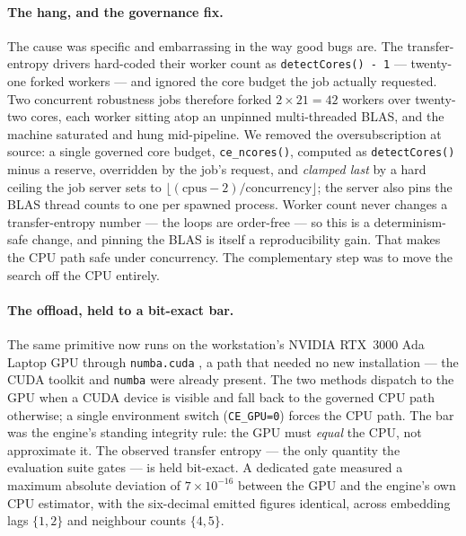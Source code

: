 \documentclass[11pt]{article}
\newcommand{\code}[1]{\texttt{\small #1}}
\begin{document}
\paragraph{The hang, and the governance fix.} The cause was specific and
embarrassing in the way good bugs are. The transfer-entropy drivers hard-coded
their worker count as \code{detectCores() - 1} --- twenty-one forked workers ---
and ignored the core budget the job actually requested. Two concurrent
robustness jobs therefore forked $2 \times 21 = 42$ workers over twenty-two
cores, each worker sitting atop an unpinned multi-threaded BLAS, and the machine
saturated and hung mid-pipeline. We removed the oversubscription at source: a
single governed core budget, \code{ce\_ncores()}, computed as
\code{detectCores()} minus a reserve, overridden by the job's request, and
\emph{clamped last} by a hard ceiling the job server sets to
$\lfloor(\text{cpus}-2)/\text{concurrency}\rfloor$; the server also pins the BLAS
thread counts to one per spawned process. Worker count never changes a
transfer-entropy number --- the loops are order-free --- so this is a
determinism-safe change, and pinning the BLAS is itself a reproducibility gain.
That makes the CPU path safe under concurrency. The complementary step was to
move the search off the CPU entirely.

\paragraph{The offload, held to a bit-exact bar.} The same primitive now runs on
the workstation's NVIDIA RTX~3000 Ada Laptop GPU through \code{numba.cuda}
\cite{numba2015}, a path that needed no new installation --- the CUDA toolkit
and \code{numba} were already present. The two methods dispatch to the GPU when
a CUDA device is visible and fall back to the governed CPU path otherwise; a
single environment switch (\code{CE\_GPU=0}) forces the CPU path. The bar was the
engine's standing integrity rule: the GPU must \emph{equal} the CPU, not
approximate it. The observed transfer entropy --- the only quantity the
evaluation suite gates --- is held bit-exact. A dedicated gate measured a maximum
absolute deviation of $7\times10^{-16}$ between the GPU and the engine's own CPU
estimator, with the six-decimal emitted figures identical, across embedding lags
$\{1,2\}$ and neighbour counts $\{4,5\}$.
\end{document}
